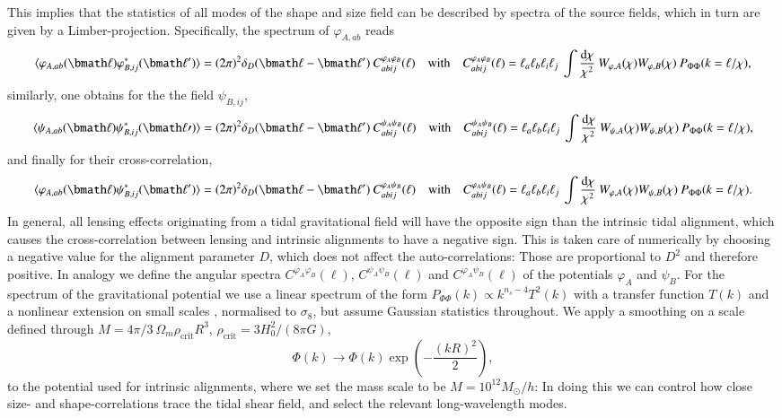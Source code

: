 \documentclass[a4paper,fleqn,usenatbib]{mnras}
\newcommand{\bra}{\langle}
\newcommand{\ket}{\rangle}
\newcommand{\dd}{\mathrm{d}}
\newcommand{\dirac}{\delta_D}
\begin{document}
This implies that the statistics of all modes of the shape and size field can be described by spectra of the source fields, which in turn are given by a Limber-projection. Specifically, the spectrum of $\varphi_{A,ab}$ reads
\begin{equation}
\bra\varphi_{A,ab}(\bmath\ell)\varphi_{B,ij}^*(\bmath\ell^\prime)\ket = 
(2\pi)^2\dirac(\bmath\ell-\bmath\ell^\prime)\:C^{\varphi_A\varphi_B}_{abij}(\ell)
\quad\mathrm{with}\quad
C^{\varphi_A\varphi_B}_{abij}(\ell) = 
\ell_a\ell_b\ell_i\ell_j\:\int\frac{\dd\chi}{\chi^2}\:W_{\varphi,A}(\chi)W_{\varphi,B}(\chi)\:P_{\Phi\Phi}(k = \ell/\chi),
\end{equation}
similarly, one obtains for the the field $\psi_{B,ij}$,
\begin{equation}
\bra\psi_{A,ab}(\bmath\ell)\psi_{B,ij}^*(\bmath\ell\prime)\ket = 
(2\pi)^2\dirac(\bmath\ell-\bmath\ell^\prime)\:C^{\psi_A\psi_B}_{abij}(\ell)
\quad\mathrm{with}\quad
C^{\psi_A\psi_B}_{abij}(\ell) = 
\ell_a\ell_b\ell_i\ell_j\:\int\frac{\dd\chi}{\chi^2}\:W_{\psi,A}(\chi)W_{\psi,B}(\chi)\:P_{\Phi\Phi}(k = \ell/\chi),
\end{equation}
and finally for their cross-correlation,
\begin{equation}
\bra\varphi_{A,ab}(\bmath\ell)\psi_{B,ij}^*(\bmath\ell^\prime)\ket =
(2\pi)^2\dirac(\bmath\ell-\bmath\ell^\prime)\:C^{\varphi_A\psi_B}_{abij}(\ell)
\quad\mathrm{with}\quad
C^{\varphi_A\psi_B}_{abij}(\ell) =
\ell_a\ell_b\ell_i\ell_j\:\int\frac{\dd\chi}{\chi^2}\:W_{\varphi,A}(\chi)W_{\psi,B}(\chi)\:P_{\Phi\Phi}(k = \ell/\chi).
\end{equation}
In general, all lensing effects originating from a tidal gravitational field will have the opposite sign than the intrinsic tidal alignment, which causes the cross-correlation between lensing and intrinsic alignments to have a negative sign. This is taken care of numerically by choosing a negative value for the alignment parameter $D$, which does not affect the auto-correlations: Those are proportional to $D^2$ and therefore positive. In analogy we define the angular spectra $C^{\varphi_A\varphi_B}(\ell)$, $C^{\psi_A\psi_B}(\ell)$ and $C^{\varphi_A\psi_B}(\ell)$ of the potentials $\varphi_A$ and  $\psi_B$. For the spectrum of the gravitational potential we use a linear spectrum of the form $P_{\Phi\Phi}(k)\propto k^{n_s-4}T^2(k)$ with a transfer function $T(k)$ and a nonlinear extension on small scales \citep{cooray_power_2001, huterer_calibrating_2005}, normalised to $\sigma_8$, but assume Gaussian statistics throughout. We apply a smoothing on a scale defined through $M = 4\pi/3\:\Omega_m\rho_\mathrm{crit}R^3$, $\rho_\mathrm{crit} = 3H_0^2/(8\pi G)$, 
\begin{equation}
\Phi(k) \rightarrow \Phi(k)\exp\left(-\frac{(kR)^2}{2}\right),
\end{equation}
to the potential used for intrinsic alignments, where we set the mass scale to be $M=10^{12}M_\odot/h$: In doing this we can control how close size- and shape-correlations trace the tidal shear field, and select the relevant long-wavelength modes.
\end{document}
